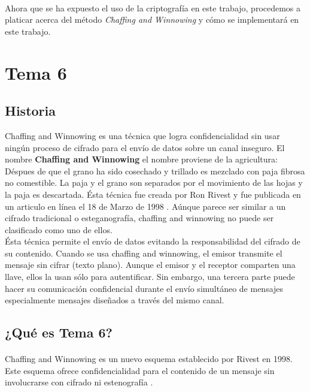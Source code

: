 \documentclass[12pt, a4paper, titlepage]{report}
\begin{document}
	    \paragraph{}
	    Ahora que se ha expuesto el uso de la criptografía en este trabajo, procedemos a platicar acerca del método \textit{Chaffing and Winnowing} y cómo se implementará en este trabajo.
	   
	    \section{Tema 6}
	    \subsection{Historia}
	    Chaffing and Winnowing es una técnica que logra confidencialidad sin usar ning\'un proceso de cifrado para el env\'io de datos sobre un canal inseguro. El nombre \textbf{Chaffing and Winnowing} el nombre proviene de la agricultura: D\'espues de que el grano ha sido cosechado y trillado es mezclado con paja fibrosa no comestible. La paja y el grano son separados por el movimiento de las hojas y la paja es descartada.
	    \'Esta t\'ecnica fue creada por Ron Rivest y fue publicada en un articulo en l\'inea el 18 de Marzo de 1998 \cite{refCryptohraphyWithoutEncryption}.
	    A\'unque parece ser similar a un cifrado tradicional o esteganograf\'ia, chaffing and winnowing no puede ser clasificado como uno de ellos.\\
	    \'Esta t\'ecnica permite el env\'io de datos evitando la responsabilidad del cifrado de su contenido. Cuando se usa chaffing and winnowing, el emisor transmite el mensaje sin cifrar (texto plano). Aunque el emisor y el receptor comparten una llave, ellos la usan s\'olo para autentificar. Sin embargo, una tercera parte puede hacer su comunicaci\'on confidencial durante el env\'io simult\'aneo de mensajes especialmente mensajes diseñados a través del mismo canal.
	    
	    \subsection{¿Qu\'e es Tema 6?}
	    
	    \paragraph{}
        Chaffing and Winnowing es un nuevo esquema establecido por Rivest en 1998. Este esquema ofrece confidencialidad para el contenido de un mensaje sin involucrarse con cifrado ni estenografía \cite{refCriptografia}.
	    
\end{document}
